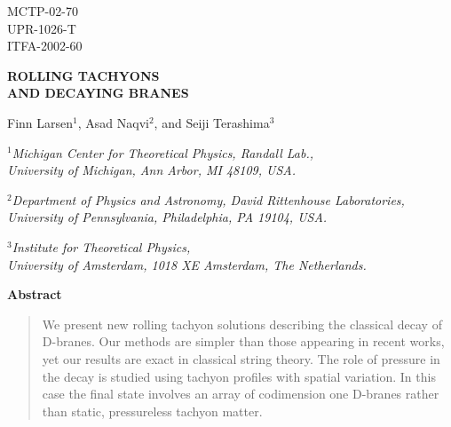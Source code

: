 \documentclass[a4paper,12pt]{article}
\begin{document}
\begin{center}
            \hfill    MCTP-02-70  \\
            \hfill    UPR-1026-T \\
            \hfill ITFA-2002-60 \\

\end{center}

\bigskip

\begin{center}
{\large \bf ROLLING TACHYONS \\
AND DECAYING BRANES }
\end{center}

\begin{center}
Finn Larsen$^{1}$, Asad Naqvi$^{2}$, and Seiji Terashima$^{3}$
\end{center}

\begin{center}
$^{1}${\it Michigan Center for Theoretical Physics, Randall
Lab.,\\

University of Michigan, Ann Arbor, MI 48109, USA.}
\end{center}

\begin{center}
$^{2}${\it Department of Physics and Astronomy, David Rittenhouse Laboratories, \\
University of Pennsylvania, Philadelphia, PA 19104, USA. }
\end{center}

\begin{center}
$^{3}${\it Institute for Theoretical Physics,\\
University of Amsterdam, 1018 XE Amsterdam, The Netherlands.}
\end{center}

\bigskip

\begin{center}
{\bf Abstract}
\end{center}

\begin{quotation}
We present new rolling tachyon solutions describing the classical decay of D-branes. 
Our methods are simpler than  those appearing in recent works, yet our results are exact in classical string theory. The role of  pressure in the decay is studied using tachyon profiles 
with spatial variation. In this case the final state involves an array of codimension one 
D-branes rather than static, pressureless tachyon matter. 
\end{quotation}
\end{document}
